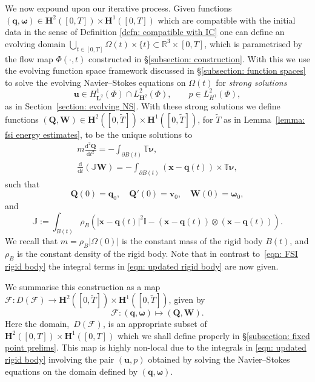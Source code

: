 \documentclass[a4paper]{amsart}
\numberwithin{equation}{section}
\theoremstyle{plain}
\newcommand{\mbf}[1]{\mathbf{#1}}
\newcommand{\mbb}[1]{\mathbb{#1}}
\begin{document}
We now expound upon our iterative process.
Given functions $(\mbf{q}, \boldsymbol{\omega}) \in \mbf{H}^2([0,T]) \times \mbf{H}^1([0,T])$ which are compatible with the initial data in the sense of Definition \ref{defn: compatible with IC} one can define an evolving domain $\bigcup_{t \in [0,T]}\Omega(t) \times \{t \} \subset \mbb{R}^3 \times [0,T] $, which is parametrised by the flow map $\Phi(\cdot, t)$ constructed in \S\ref{subsection: construction}.
With this we use the evolving function space framework discussed in \S\ref{subsection: function spaces} to solve the evolving Navier--Stokes equations on $\Omega(t)$ for \emph{strong solutions}
\[\mbf{u} \in H^1_{\mbf{L}^2}(\Phi) \cap L^2_{\mbf{H}^2}(\Phi), \qquad p \in  L^2_{H^1}(\Phi),\]
as in Section~\ref{section: evolving NS}.
With these strong solutions we define functions $(\mbf{Q}, \mbf{W}) \in \mbf{H}^2([0,\widetilde{T}]) \times \mbf{H}^1([0,\widetilde{T}])$, for $\widetilde{T}$ as in Lemma~\ref{lemma: fsi energy estimates}, to be the unique solutions to
\begin{subequations}
\label{eqn: updated rigid body}
\begin{gather}
	m \frac{\mathrm{d}^2 \mbf{Q}}{\mathrm{d}t^2} = - \int_{\partial B(t)} \mbb{T} \boldsymbol{\nu},\label{eqn: updated position}\\
	\frac{\mathrm{d}}{\mathrm{d}t} \left( \mbb{J} \mbf{W} \right) = - \int_{\partial B(t)} (\mbf{x} - \mbf{q}(t)) \times \mbb{T} \boldsymbol{\nu}, \label{eqn: updated angular}
\end{gather}
\end{subequations}
such that
\[ \mbf{Q}(0) = \mbf{q}_0, \quad \mbf{Q}'(0) = \mbf{v}_0, \quad \mbf{W}(0) = \boldsymbol{\omega}_0, \]
and
\[ \mbb{J} := \int_{B(t)} \rho_B \left( |\mbf{x}-\mbf{q}(t)|^2 \mbb{I} - (\mbf{x} - \mbf{q}(t)) \otimes (\mbf{x} - \mbf{q}(t)) \right) .\]
We recall that $m = \rho_B |\Omega(0)|$ is the constant mass of the rigid body $B(t)$, and $\rho_B$ is the constant density of the rigid body.
Note that in contrast to~\eqref{eqn: FSI rigid body} the integral terms in \eqref{eqn: updated rigid body} are now given.

We summarise this construction as a map $\mathscr{F}: D(\mathscr{F}) \rightarrow \mbf{H}^2([0,\widetilde{T}]) \times \mbf{H}^1([0,\widetilde{T}])$, given by
\[ \mathscr{F} : (\mbf{q}, \boldsymbol{\omega}) \mapsto (\mbf{Q}, \mbf{W}). \]
Here the domain,~$D(\mathscr{F})$, is an appropriate subset of $\mbf{H}^2([0,T]) \times \mbf{H}^1([0,T])$ which we shall define properly in \S\ref{subsection: fixed point prelims}.
This map is highly non-local due to the integrals in \eqref{eqn: updated rigid body} involving the pair $(\mbf{u}, p)$ obtained by solving the Navier--Stokes equations on the domain defined by $(\mbf{q}, \boldsymbol{\omega})$.
\end{document}
